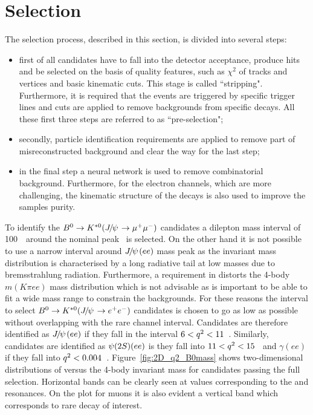 \section{Selection}
\label{sec:RKst_selection}

The selection process, described in this section, is divided into several steps:
\begin{itemize}
\item first of all candidates have to fall into the detector acceptance, produce hits and be selected
on the basis of quality features, such as $\chi^2$ of tracks and vertices and basic kinematic cuts.
This stage is called ``stripping". Furthermore, it is required that the events are triggered by specific
trigger lines and cuts are applied to remove backgrounds from specific decays.
All these first three steps are referred to as ``pre-selection";
\item secondly, particle identification requirements are applied to remove part of misreconstructed
background and clear the way for the last step;
\item in the final step a neural network is used to remove combinatorial background. Furthermore,
for the electron channels, which are more challenging, the kinematic structure of the decays
is also used to improve the samples purity.
\end{itemize}
%
To identify the $\Bz \to\Kstarz(\jpsi\to \mumu)$ candidates a dilepton mass
interval of 100~\mevcc~around the nominal \jpsi peak~\cite{PDG2014} is selected.
On the other hand it is not possible to use a narrow interval around $\jpsi(ee)$ mass peak as the invariant mass
distribution is characterised by a long radiative tail at low masses due to bremsstrahlung radiation.
Furthermore, a requirement in \qsq distorts the 4-body $m(K\pi ee)$ mass distribution which is not advisable as is
important to be able to fit a wide mass range to constrain the backgrounds. For these reasons the interval to select
$\Bz \to\Kstarz(\jpsi\to \ee)$ candidates is chosen to go as low as possible without overlapping with
the rare channel interval. Candidates are therefore identified as $\jpsi(ee)$ if they fall in the \qsq interval
$6 < {q^2} < 11$~\gevgevcccc. Similarly, candidates are identified as $\psitwos(ee)$ is they fall into $11 < {q^2} < 15$~\gevgevcccc
and $\gamma(ee)$ if they fall into ${q^2} < 0.004$~\gevgevcccc.
Figure~\ref{fig:2D_q2_B0mass} shows two-dimensional distributions of \qsq versus the 4-body invariant mass 
for candidates passing the full selection. Horizontal bands can be clearly seen at \qsq values corresponding to the \jpsi and \psitwos resonances.
On the plot for muons it is also evident a vertical band which corresponds to rare decay of interest.

